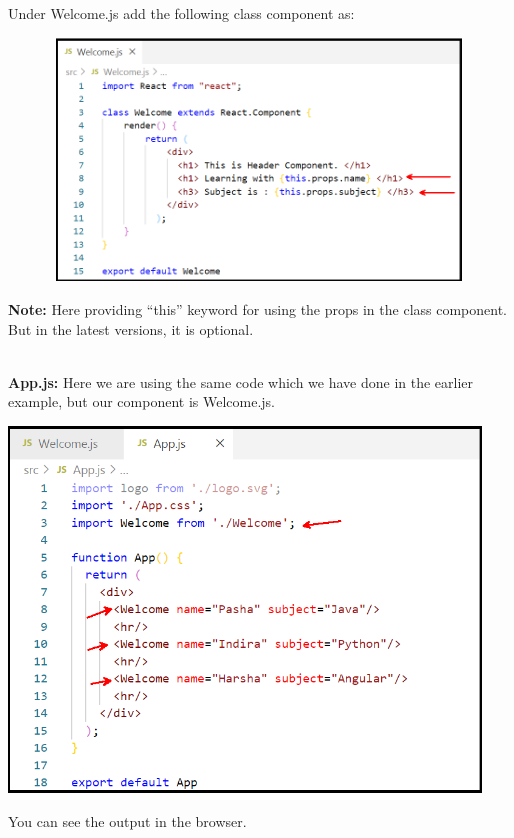 \documentclass{article}
\begin{document}
\noindent 

\noindent 
Under Welcome.js add the following class component as:

\begin{center}
	\noindent \includegraphics*[width=5.23in, height=2.54in]{IMG-08-15}
\end{center}

\noindent 
\textbf{Note:} Here providing ``this'' keyword for using the props in the class component. But in the latest versions, it is optional.

\noindent \\
\textbf{App.js:} Here we are using the same code which we have done in the earlier example, but our component is Welcome.js.

\begin{center}
	\noindent \includegraphics*[width=4.94in, height=3.83in]{IMG-08-16}
\end{center}

\noindent 

\noindent 
You can see the output in the browser.
\end{document}
